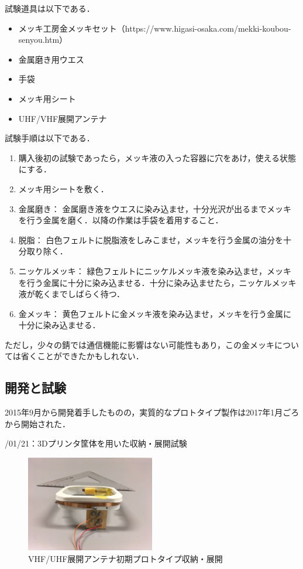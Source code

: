 試験道具は以下である．
\begin{itemize}
	\item メッキ工房金メッキセット（https://www.higasi-osaka.com/mekki-koubou-senyou.htm）
	\item 金属磨き用ウエス
	\item 手袋
	\item メッキ用シート
	\item UHF/VHF展開アンテナ
\end{itemize}
試験手順は以下である．
\begin{enumerate}
	\item 購入後初の試験であったら，メッキ液の入った容器に穴をあけ，使える状態にする．
	\item メッキ用シートを敷く．
	\item 金属磨き：	金属磨き液をウエスに染み込ませ，十分光沢が出るまでメッキを行う金属を磨く．以降の作業は手袋を着用すること．
	\item 脱脂：	白色フェルトに脱脂液をしみこませ，メッキを行う金属の油分を十分取り除く．
	\item ニッケルメッキ：	緑色フェルトにニッケルメッキ液を染み込ませ，メッキを行う金属に十分に染み込ませる．十分に染み込ませたら，ニッケルメッキ液が乾くまでしばらく待つ．
	\item 金メッキ：	黄色フェルトに金メッキ液を染み込ませ，メッキを行う金属に十分に染み込ませる．
\end{enumerate}

ただし，少々の錆では通信機能に影響はない可能性もあり，この金メッキについては省くことができたかもしれない．

\subsection{開発と試験}

2015年9月から開発着手したものの，実質的なプロトタイプ製作は2017年1月ごろから開始された．

/01/21：3Dプリンタ筐体を用いた収納・展開試験
\begin{figure}[H]
	\centering
	\includegraphics[width=0.5\textwidth]{03/fig/3-8-5.jpg}
	\caption{VHF/UHF展開アンテナ初期プロトタイプ収納・展開}
	\label{fig3-8-5}
\end{figure}

